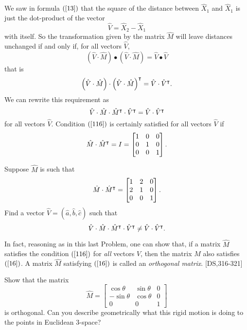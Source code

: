 \documentclass{ximera}
\begin{document}
We saw in formula $\left(  \ref{13}\right)  $ that the square of the distance
between $\hat{X}_{1}$ and $\hat{X}_{1}$ is just the dot-product of the vector%
\[
\hat{V}=\hat{X}_{2}-\hat{X}_{1}%
\]
with itself. So the transformation given by the matrix $\hat{M}$ will leave
distances unchanged if and only if, for all vectors $\hat{V}$,%
\[
\left(  \hat{V}  \cdot\hat{M} \right) \bullet\left(
\hat{V}  \cdot\hat{M}\right)  =\hat{V}\bullet\hat{V}%
\]
that is%
\[
\left( \hat{V}  \cdot\hat{M} \right) \cdot\left(
\hat{V}  \cdot\hat{M}\right)  ^\intercal=\hat{V}  \cdot
\hat{V}  ^\intercal.
\]
We can rewrite this requirement as%
\begin{equation}
\hat{V}  \cdot\hat{M}\cdot\hat{M}^\transpose\cdot  \hat
{V}  ^\transpose=\hat{V}  \cdot\hat{V}  ^\transpose
\label{116}%
\end{equation}
for all vectors $\hat{V}$. Condition $\left(  \ref{116}\right)  $ is certainly
satisfied for all vectors $\hat{V}$ if
\begin{equation}
\hat{M}\cdot\hat{M}^\transpose=I=\begin{bmatrix}
%
1 & 0 & 0\\
0 & 1 & 0\\
0 & 0 & 1
\end{bmatrix}
  . \label{16}%
\end{equation}


\begin{problem}
Suppose $\hat{M}$ is such that%
\[
\hat{M}\cdot\hat{M}^\transpose=\begin{bmatrix}
%
1 & 2 & 0\\
2 & 1 & 0\\
0 & 0 & 1
\end{bmatrix}
  .
\]
Find a vector $\hat{V}=\left(  \hat{a},\hat{b},\hat{c}\right)  $ such that%
\[
\hat{V} \cdot\hat{M}\cdot\hat{M}^\intercal\cdot\hat{V}  ^\intercal\neq\hat{V}  \cdot\hat{V}
^\intercal.
\]

\end{problem}

In fact, reasoning as in this last Problem, one can show that, if a matrix
$\hat{M}$ satisfies the condition $\left(  \ref{116}\right)  $ for
\textit{all} vectors $\hat{V}$, then the matrix $\hat{M}$ also satisfies
$\left(  \ref{16}\right)  $. A matrix $\hat{M}$ satisfying $\left(
\ref{16}\right)  $ is called an \textit{orthogonal matrix}. [DS,316-321]

\begin{problem}
\label{14} Show that the matrix%
\[
\hat{M}=\begin{bmatrix}
\cos\theta & \sin\theta & 0\\
-\sin\theta & \cos\theta & 0\\
0 & 0 & 1
\end{bmatrix}
\]
is orthogonal. Can you describe geometrically what this rigid motion is doing
to the points in Euclidean $3$-space?
\end{problem}
\end{document}

